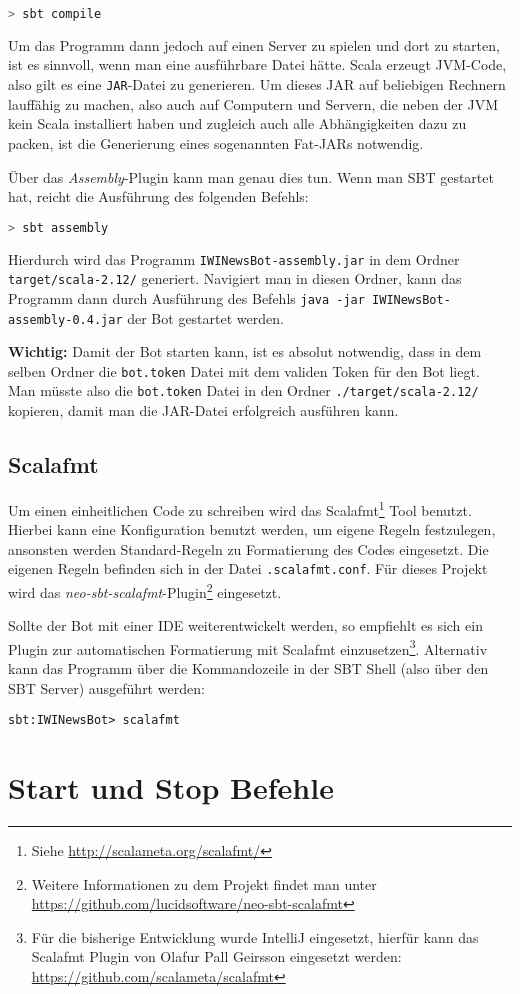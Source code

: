 \begin{lstlisting}[language=bash]
> sbt compile
\end{lstlisting}

Um das Programm dann jedoch auf einen Server zu spielen und dort zu starten, ist es sinnvoll, wenn man eine ausführbare Datei hätte. Scala erzeugt JVM-Code, also gilt es eine \texttt{JAR}-Datei zu generieren. Um dieses JAR auf beliebigen Rechnern lauffähig zu machen, also auch auf Computern und Servern, die neben der JVM kein Scala installiert haben und zugleich auch alle Abhängigkeiten dazu zu packen, ist die Generierung eines sogenannten Fat-JARs notwendig.

Über das \emph{Assembly}-Plugin kann man genau dies tun. Wenn man SBT gestartet hat, reicht die Ausführung des folgenden Befehls:

\begin{lstlisting}[language=bash]
> sbt assembly
\end{lstlisting}

Hierdurch wird das Programm \texttt{IWINewsBot\allowbreak-assembly\allowbreak.jar} in dem Ordner \texttt{target\allowbreak/scala-2.12/} generiert. Navigiert man in diesen Ordner, kann das Programm dann durch Ausführung des Befehls \texttt{java -jar IWINewsBot-assembly-0.4.jar} der Bot gestartet werden.

\textbf{Wichtig:} Damit der Bot starten kann, ist es absolut notwendig, dass in dem selben Ordner die \texttt{bot.token} Datei mit dem validen Token für den Bot liegt. Man müsste also die \texttt{bot.token} Datei in den Ordner \texttt{./target/scala-2.12/} kopieren, damit man die JAR-Datei erfolgreich ausführen kann.

\subsection{Scalafmt}
Um einen einheitlichen Code zu schreiben wird das Scalafmt\footnote{Siehe \url{http://scalameta.org/scalafmt/}} Tool benutzt. Hierbei kann eine Konfiguration benutzt werden, um eigene Regeln festzulegen, ansonsten werden Standard-Regeln zu Formatierung des Codes eingesetzt. Die eigenen Regeln befinden sich in der Datei \texttt{.scalafmt.conf}. Für dieses Projekt wird das \emph{neo-sbt-scalafmt}-Plugin\footnote{Weitere Informationen zu dem Projekt findet man unter \url{https://github.com/lucidsoftware/neo-sbt-scalafmt}} eingesetzt.

Sollte der Bot mit einer IDE weiterentwickelt werden, so empfiehlt es sich ein Plugin zur automatischen Formatierung mit Scalafmt einzusetzen\footnote{Für die bisherige Entwicklung wurde IntelliJ eingesetzt, hierfür kann das Scalafmt Plugin von Olafur Pall Geirsson eingesetzt werden: \url{https://github.com/scalameta/scalafmt}}. Alternativ kann das Programm über die Kommandozeile in der SBT Shell (also über den SBT Server) ausgeführt werden:

\begin{lstlisting}
sbt:IWINewsBot> scalafmt
\end{lstlisting}






\section{Start und Stop Befehle}\label{sec:StartStopCommands}
